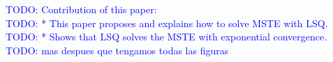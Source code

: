 \documentclass{CFD2011}
\newcommand{\TODO}[1]{\textcolor{blue}{TODO: #1} \\}
\begin{document}
\TODO{Contribution of this paper:}

\TODO{    * This paper proposes and explains how to solve MSTE with LSQ.}
\TODO{    * Shows that LSQ solves the MSTE with exponential convergence.}


\TODO{mas despues que tengamos todas las figuras}

%
%
%
%
%
%
%
%
%
%
%
%
\end{document}

